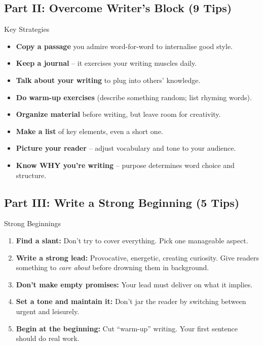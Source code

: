 \documentclass[12pt,a4paper]{article}
\begin{document}
\subsection{Part II: Overcome Writer's Block (9 Tips)}

\begin{tipbox}{Key Strategies}
\begin{itemize}[noitemsep]
    \item \textbf{Copy a passage} you admire word-for-word to internalise good style.
    \item \textbf{Keep a journal} -- it exercises your writing muscles daily.
    \item \textbf{Talk about your writing} to plug into others' knowledge.
    \item \textbf{Do warm-up exercises} (describe something random; list rhyming words).
    \item \textbf{Organize material} before writing, but leave room for creativity.
    \item \textbf{Make a list} of key elements, even a short one.
    \item \textbf{Picture your reader} -- adjust vocabulary and tone to your audience.
    \item \textbf{Know WHY you're writing} -- purpose determines word choice and structure.
\end{itemize}
\end{tipbox}

\subsection{Part III: Write a Strong Beginning (5 Tips)}

\begin{keybox}{Strong Beginnings}
\begin{enumerate}[noitemsep]
    \item \textbf{Find a slant:} Don't try to cover everything. Pick one manageable aspect.
    \item \textbf{Write a strong lead:} Provocative, energetic, creating curiosity. Give readers something to \textit{care about} before drowning them in background.
    \item \textbf{Don't make empty promises:} Your lead must deliver on what it implies.
    \item \textbf{Set a tone and maintain it:} Don't jar the reader by switching between urgent and leisurely.
    \item \textbf{Begin at the beginning:} Cut ``warm-up'' writing. Your first sentence should do real work.
\end{enumerate}
\end{keybox}
\end{document}
